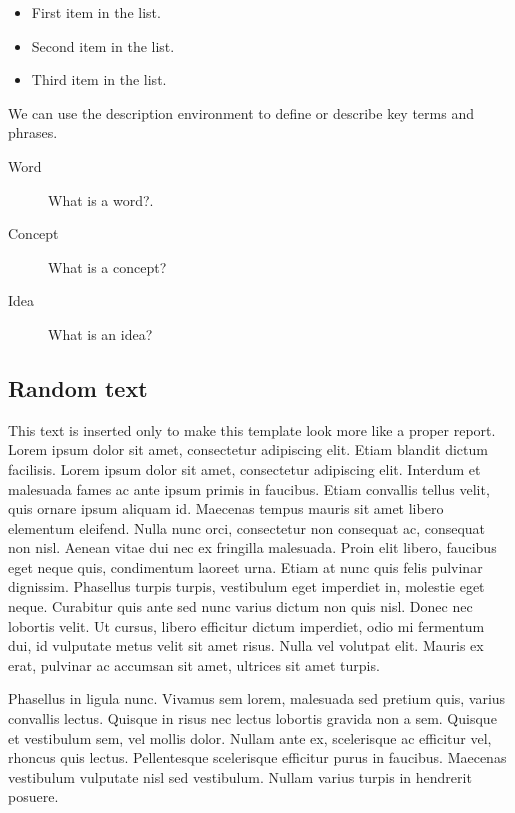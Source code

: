 \documentclass[fleqn,moreauthors,10pt]{ds_report}
\begin{document}
\begin{itemize}[noitemsep]
	\item First item in the list.
	\item Second item in the list.
	\item Third item in the list.
\end{itemize}

We can use the description environment to define or describe key terms and phrases.

\begin{description}
	\item[Word] What is a word?.
	\item[Concept] What is a concept?
	\item[Idea] What is an idea?
\end{description}


\subsection*{Random text}

This text is inserted only to make this template look more like a proper report. Lorem ipsum dolor sit amet, consectetur adipiscing elit. Etiam blandit dictum facilisis. Lorem ipsum dolor sit amet, consectetur adipiscing elit. Interdum et malesuada fames ac ante ipsum primis in faucibus. Etiam convallis tellus velit, quis ornare ipsum aliquam id. Maecenas tempus mauris sit amet libero elementum eleifend. Nulla nunc orci, consectetur non consequat ac, consequat non nisl. Aenean vitae dui nec ex fringilla malesuada. Proin elit libero, faucibus eget neque quis, condimentum laoreet urna. Etiam at nunc quis felis pulvinar dignissim. Phasellus turpis turpis, vestibulum eget imperdiet in, molestie eget neque. Curabitur quis ante sed nunc varius dictum non quis nisl. Donec nec lobortis velit. Ut cursus, libero efficitur dictum imperdiet, odio mi fermentum dui, id vulputate metus velit sit amet risus. Nulla vel volutpat elit. Mauris ex erat, pulvinar ac accumsan sit amet, ultrices sit amet turpis.

Phasellus in ligula nunc. Vivamus sem lorem, malesuada sed pretium quis, varius convallis lectus. Quisque in risus nec lectus lobortis gravida non a sem. Quisque et vestibulum sem, vel mollis dolor. Nullam ante ex, scelerisque ac efficitur vel, rhoncus quis lectus. Pellentesque scelerisque efficitur purus in faucibus. Maecenas vestibulum vulputate nisl sed vestibulum. Nullam varius turpis in hendrerit posuere.
\end{document}
